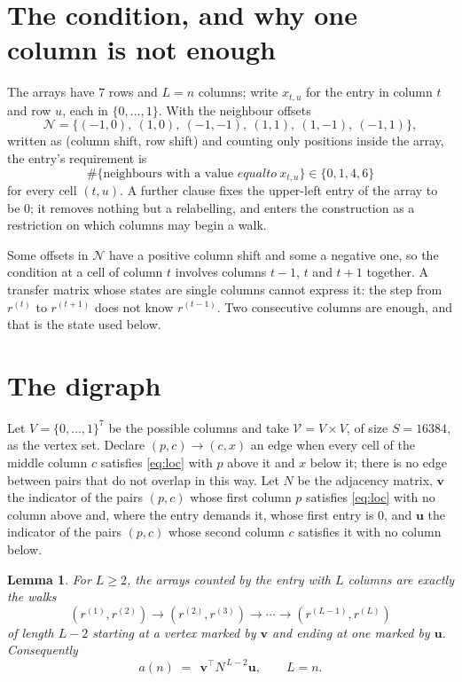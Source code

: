 \documentclass[11pt,a4paper]{article}
\theoremstyle{plain}
\newtheorem{lemma}[theorem]{Lemma}
\theoremstyle{definition}
\begin{document}
\section{The condition, and why one column is not enough}

The arrays have $7$ rows and $L=n$ columns; write $x_{t,u}$ for the entry in
column $t$ and row $u$, each in $\{0,\dots,1\}$. With the neighbour offsets
\[
\mathcal N=\{(-1,0),\ (1,0),\ (-1,-1),\ (1,1),\ (1,-1),\ (-1,1)\},
\]
written as (column shift, row shift) and counting only positions inside the array, the
entry's requirement is
\begin{equation}\label{eq:loc}
\#\{\text{neighbours with a value }equal to\ x_{t,u}\}\in\{0,1,4,6\}
\end{equation}
for every cell $(t,u)$. A further clause fixes the upper-left entry of the array to be $0$; it removes nothing but a relabelling, and enters the construction as a restriction on which columns may begin a walk.

Some offsets in $\mathcal N$ have a positive column shift and some a negative one, so the
condition at a cell of column $t$ involves columns $t-1$, $t$ and $t+1$ together. A transfer
matrix whose states are single columns cannot express it: the step from $r^{(t)}$ to
$r^{(t+1)}$ does not know $r^{(t-1)}$. Two consecutive columns are enough, and that is
the state used below.

\section{The digraph}

Let $V=\{0,\dots,1\}^{7}$ be the possible columns and take
$\mathcal V=V\times V$, of size $S=16384$, as the vertex set. Declare $(p,c)\to(c,x)$ an edge
when every cell of the middle column $c$ satisfies \eqref{eq:loc} with $p$ above it and $x$
below it; there is no edge between pairs that do not overlap in this way. Let $N$ be the
adjacency matrix, $\mathbf{v}$ the indicator of the pairs $(p,c)$ whose first column $p$
satisfies \eqref{eq:loc} with no column above and, where the entry demands it, whose first entry is $0$, and $\mathbf{u}$ the indicator of
the pairs $(p,c)$ whose second column $c$ satisfies it with no column below.

\begin{lemma}\label{lem:walk}
For $L\ge2$, the arrays counted by the entry with $L$ columns are exactly the walks
\[
(r^{(1)},r^{(2)})\to(r^{(2)},r^{(3)})\to\cdots\to(r^{(L-1)},r^{(L)})
\]
of length $L-2$ starting at a vertex marked by $\mathbf{v}$ and ending at one marked by
$\mathbf{u}$. Consequently
\[
a(n)\;=\;\,\mathbf{v}^{\!\top}N^{\,L-2}\mathbf{u},\qquad L=n .
\]
\end{lemma}
\end{document}
